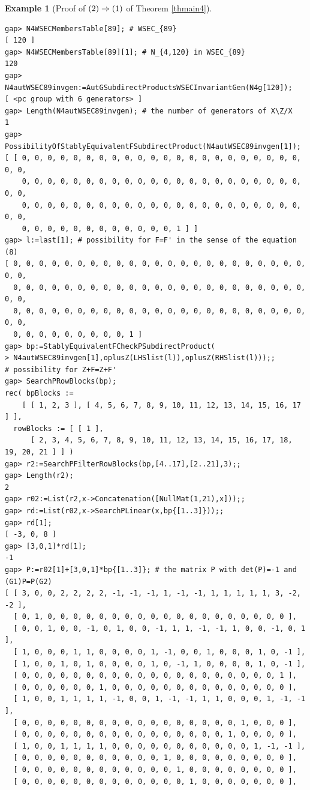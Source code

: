 \documentclass{amsart}
\theoremstyle{plain}
\theoremstyle{definition}
\newtheorem{example}[theorem]{Example}
\theoremstyle{remark}
\begin{document}
\begin{example}[Proof of ${\rm (2)}\Rightarrow {\rm (1)}$ of {Theorem \ref{thmain4}}]
\begin{verbatim}
gap> N4WSECMembersTable[89]; # WSEC_{89}
[ 120 ]
gap> N4WSECMembersTable[89][1]; # N_{4,120} in WSEC_{89}
120
gap> N4autWSEC89invgen:=AutGSubdirectProductsWSECInvariantGen(N4g[120]);
[ <pc group with 6 generators> ]
gap> Length(N4autWSEC89invgen); # the number of generators of X\Z/X
1
gap> PossibilityOfStablyEquivalentFSubdirectProduct(N4autWSEC89invgen[1]);
[ [ 0, 0, 0, 0, 0, 0, 0, 0, 0, 0, 0, 0, 0, 0, 0, 0, 0, 0, 0, 0, 0, 0, 0, 0, 
    0, 0, 0, 0, 0, 0, 0, 0, 0, 0, 0, 0, 0, 0, 0, 0, 0, 0, 0, 0, 0, 0, 0, 0, 
    0, 0, 0, 0, 0, 0, 0, 0, 0, 0, 0, 0, 0, 0, 0, 0, 0, 0, 0, 0, 0, 0, 0, 0, 
    0, 0, 0, 0, 0, 0, 0, 0, 0, 0, 0, 0, 1 ] ]
gap> l:=last[1]; # possibility for F=F' in the sense of the equation (8)
[ 0, 0, 0, 0, 0, 0, 0, 0, 0, 0, 0, 0, 0, 0, 0, 0, 0, 0, 0, 0, 0, 0, 0, 0, 0, 
  0, 0, 0, 0, 0, 0, 0, 0, 0, 0, 0, 0, 0, 0, 0, 0, 0, 0, 0, 0, 0, 0, 0, 0, 0, 
  0, 0, 0, 0, 0, 0, 0, 0, 0, 0, 0, 0, 0, 0, 0, 0, 0, 0, 0, 0, 0, 0, 0, 0, 0, 
  0, 0, 0, 0, 0, 0, 0, 0, 0, 1 ]
gap> bp:=StablyEquivalentFCheckPSubdirectProduct(
> N4autWSEC89invgen[1],oplusZ(LHSlist(l)),oplusZ(RHSlist(l)));;
# possibility for Z+F=Z+F'
gap> SearchPRowBlocks(bp);
rec( bpBlocks := 
    [ [ 1, 2, 3 ], [ 4, 5, 6, 7, 8, 9, 10, 11, 12, 13, 14, 15, 16, 17 ] ], 
  rowBlocks := [ [ 1 ], 
      [ 2, 3, 4, 5, 6, 7, 8, 9, 10, 11, 12, 13, 14, 15, 16, 17, 18, 19, 20, 21 ] ] )
gap> r2:=SearchPFilterRowBlocks(bp,[4..17],[2..21],3);;
gap> Length(r2);
2
gap> r02:=List(r2,x->Concatenation([NullMat(1,21),x]));;
gap> rd:=List(r02,x->SearchPLinear(x,bp{[1..3]}));;
gap> rd[1];
[ -3, 0, 8 ]
gap> [3,0,1]*rd[1];
-1
gap> P:=r02[1]+[3,0,1]*bp{[1..3]}; # the matrix P with det(P)=-1 and (G1)P=P(G2)
[ [ 3, 0, 0, 2, 2, 2, 2, -1, -1, -1, 1, -1, -1, 1, 1, 1, 1, 1, 3, -2, -2 ], 
  [ 0, 1, 0, 0, 0, 0, 0, 0, 0, 0, 0, 0, 0, 0, 0, 0, 0, 0, 0, 0, 0 ], 
  [ 0, 0, 1, 0, 0, -1, 0, 1, 0, 0, -1, 1, 1, -1, -1, 1, 0, 0, -1, 0, 1 ], 
  [ 1, 0, 0, 0, 1, 1, 0, 0, 0, 0, 1, -1, 0, 0, 1, 0, 0, 0, 1, 0, -1 ], 
  [ 1, 0, 0, 1, 0, 1, 0, 0, 0, 0, 1, 0, -1, 1, 0, 0, 0, 0, 1, 0, -1 ], 
  [ 0, 0, 0, 0, 0, 0, 0, 0, 0, 0, 0, 0, 0, 0, 0, 0, 0, 0, 0, 0, 1 ], 
  [ 0, 0, 0, 0, 0, 0, 1, 0, 0, 0, 0, 0, 0, 0, 0, 0, 0, 0, 0, 0, 0 ], 
  [ 1, 0, 0, 1, 1, 1, 1, -1, 0, 0, 1, -1, -1, 1, 1, 0, 0, 0, 1, -1, -1 ], 
  [ 0, 0, 0, 0, 0, 0, 0, 0, 0, 0, 0, 0, 0, 0, 0, 0, 0, 1, 0, 0, 0 ], 
  [ 0, 0, 0, 0, 0, 0, 0, 0, 0, 0, 0, 0, 0, 0, 0, 0, 1, 0, 0, 0, 0 ], 
  [ 1, 0, 0, 1, 1, 1, 1, 0, 0, 0, 0, 0, 0, 0, 0, 0, 0, 0, 1, -1, -1 ], 
  [ 0, 0, 0, 0, 0, 0, 0, 0, 0, 0, 0, 1, 0, 0, 0, 0, 0, 0, 0, 0, 0 ], 
  [ 0, 0, 0, 0, 0, 0, 0, 0, 0, 0, 0, 0, 1, 0, 0, 0, 0, 0, 0, 0, 0 ], 
  [ 0, 0, 0, 0, 0, 0, 0, 0, 0, 0, 0, 0, 0, 1, 0, 0, 0, 0, 0, 0, 0 ], 

\end{verbatim}
\end{example}
\end{document}
